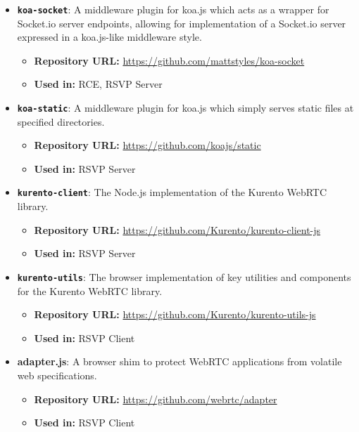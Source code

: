 \begin{itemize}
      \item \textbf{\texttt{koa-socket}}: A middleware plugin for koa.js which acts as a wrapper for Socket.io server endpoints, allowing for implementation of a Socket.io server expressed in a koa.js-like middleware style.
        \begin{itemize}
          \item \textbf{Repository URL:} \url{https://github.com/mattstyles/koa-socket}
          \item \textbf{Used in:} RCE, RSVP Server
        \end{itemize}
        
      \item \textbf{\texttt{koa-static}}: A middleware plugin for koa.js which simply serves static files at specified directories.
        \begin{itemize}
          \item \textbf{Repository URL:} \url{https://github.com/koajs/static}
          \item \textbf{Used in:} RSVP Server
        \end{itemize}
        
      \item \textbf{\texttt{kurento-client}}: The Node.js implementation of the Kurento WebRTC library.
        \begin{itemize}
          \item \textbf{Repository URL:} \url{https://github.com/Kurento/kurento-client-js}
          \item \textbf{Used in:} RSVP Server
        \end{itemize}
        
      \item \textbf{\texttt{kurento-utils}}: The browser implementation of key utilities and components for the Kurento WebRTC library.
        \begin{itemize}
          \item \textbf{Repository URL:} \url{https://github.com/Kurento/kurento-utils-js}
          \item \textbf{Used in:} RSVP Client
        \end{itemize}
        
      \item \textbf{adapter.js}: A browser shim to protect WebRTC applications from volatile web specifications.
        \begin{itemize}
          \item \textbf{Repository URL:} \url{https://github.com/webrtc/adapter}
          \item \textbf{Used in:} RSVP Client
        \end{itemize}
        

\end{itemize}
